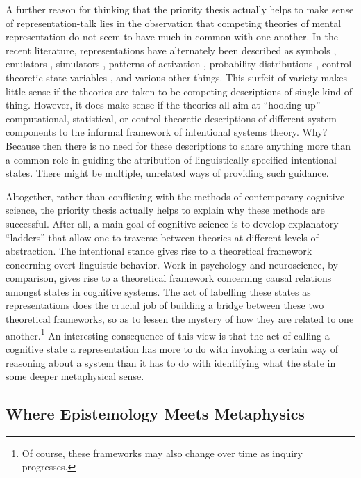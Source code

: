 A further reason for thinking that the priority thesis actually helps to make sense of representation-talk lies in the observation that competing theories of mental representation do not seem to have much in common with one another. In the recent literature, representations have alternately been described as symbols \citep{Fodor:1998}, emulators \citep{Grush:2004}, simulators \citep{Barsalou:1999}, patterns of activation \citep{McClelland:2010}, probability distributions \citep{Goodman:2015}, control-theoretic state variables \citep{Eliasmith:2003,Eliasmith:2013}, and various other things. This surfeit of variety makes little sense if the theories are taken to be competing descriptions of single kind of thing. However, it does make sense if the theories all aim at ``hooking up'' computational, statistical, or control-theoretic descriptions of different system components to the informal framework of intentional systems theory. Why? Because then there is no need for these descriptions to share anything more than a common role in guiding the attribution of linguistically specified intentional states. There might be multiple, unrelated ways of providing such guidance.

Altogether, rather than conflicting with the methods of contemporary cognitive science, the priority thesis actually helps to explain why these methods are successful. After all, a main goal of cognitive science is to develop explanatory ``ladders'' that allow one to traverse between theories at different levels of abstraction. The intentional stance gives rise to a theoretical framework concerning overt linguistic behavior. Work in psychology and neuroscience, by comparison, gives rise to a theoretical framework concerning causal relations amongst states in cognitive systems. The act of labelling these states as representations does the crucial job of building a bridge between these two theoretical frameworks, so as to lessen the mystery of how they are related to one another.\footnote{Of course, these frameworks may also change over time as inquiry progresses.} An interesting consequence of this view is that the act of calling a cognitive state a representation has more to do with invoking a certain way of reasoning about a system than it has to do with identifying what the state  in some deeper metaphysical sense.

\subsection{Where Epistemology Meets Metaphysics}

